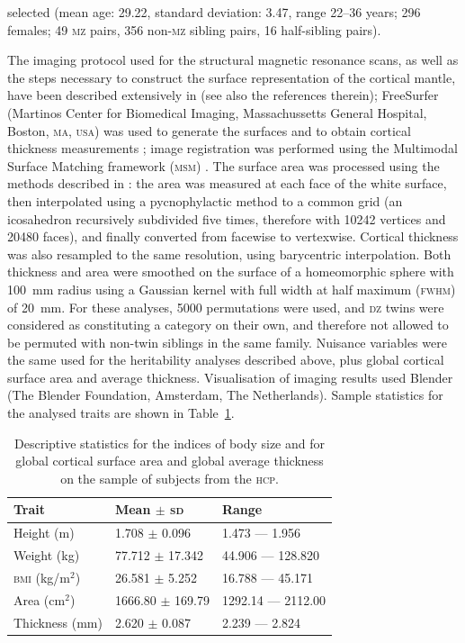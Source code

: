 selected (mean age: 29.22, standard deviation: 3.47, range 22--36 years; 296 females; 49 \textsc{mz} pairs, 356 non-\textsc{mz} sibling pairs, 16 half-sibling pairs).

The imaging protocol used for the structural magnetic resonance scans, as well as the steps necessary to construct the surface representation of the cortical mantle, have been described extensively in \citet{Glasser2013} (see also the references therein); FreeSurfer (Martinos Center for Biomedical Imaging, Massachussetts General Hospital, Boston, \textsc{ma}, \textsc{usa}) was used to generate the surfaces and to obtain cortical thickness measurements \citep{Dale1999, Fischl1999, Fischl2000}; image registration was performed using the Multimodal Surface Matching framework (\textsc{msm}) \citep{Robinson2014}. The surface area was processed using the methods described in \citet[see also Section \ref{sec:cortex:interpolation}]{Winkler2012}: the area was measured at each face of the white surface, then interpolated using a pycnophylactic method to a common grid (an icosahedron recursively subdivided five times, therefore with 10242 vertices and 20480 faces), and finally converted from facewise to vertexwise. Cortical thickness was also resampled to the same resolution, using barycentric interpolation. Both thickness and area were smoothed on the surface of a homeomorphic sphere with 100~mm radius using a Gaussian kernel with full width at half maximum (\textsc{fwhm}) of 20~mm. For these analyses, 5000 permutations were used, and \textsc{dz} twins were considered as constituting a category on their own, and therefore not allowed to be permuted with non-twin siblings in the same family. Nuisance variables were the same used for the heritability analyses described above, plus global cortical surface area and average thickness. Visualisation of imaging results used Blender (The Blender Foundation, Amsterdam, The Netherlands). Sample statistics for the analysed traits are shown in Table~\ref{tab:samplestats}.

\begin{table}[!tp]
\caption[Descriptive statistics for the relevant measurements from the \textsc{hcp} subjects.]{Descriptive statistics for the indices of body size and for global cortical surface area and global average thickness on the sample of subjects from the \textsc{hcp}.}
{\small
\begin{center}
\begin{tabular}{@{}lll@{}}
\toprule
Trait & Mean $\pm$ \textsc{sd} & Range\\
\midrule
Height (m) & 1.708 $\pm$ 0.096 & 1.473 --- 1.956\\
Weight (kg) & 77.712 $\pm$ 17.342 & 44.906 --- 128.820\\
\textsc{bmi} (kg/m$^2$) & 26.581 $\pm$ 5.252 & 16.788 --- 45.171\\
Area (cm$^2$) & 1666.80 $\pm$ 169.79 & 1292.14 --- 2112.00\\
Thickness (mm) & 2.620 $\pm$ 0.087 & 2.239 --- 2.824\\
\bottomrule   
\end{tabular}
\end{center}}
\label{tab:samplestats}
\end{table}

